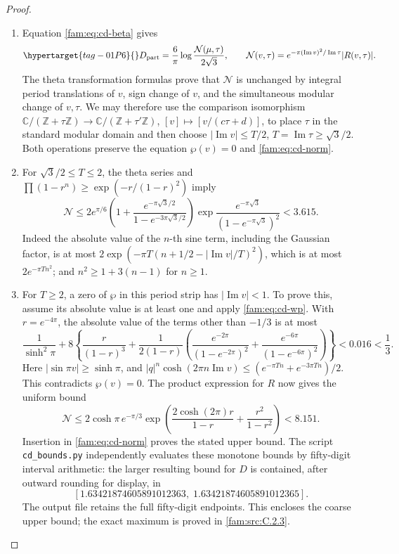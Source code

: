 \begin{proof}
\begin{enumerate}[label=\arabic*.,leftmargin=*]
\item Equation \eqref{fam:eq:cd-beta} gives
\begin{equation}\hypertarget{tag-01P6}{}\label{fam:eq:cd-norm}
 D_{\rm part}=\frac6\pi\log\frac{\mathcal N(\mu,\tau)}{2\sqrt3},
 \qquad
 \mathcal N(v,\tau)=e^{-\pi(\operatorname{Im}v)^2/\operatorname{Im}\tau}
 |R(v,\tau)|.
\end{equation}
The theta transformation formulas prove that \(\mathcal N\) is unchanged
by integral period translations of \(v\), sign change of \(v\), and the
simultaneous modular change of \(v,\tau\). We may therefore use the
comparison isomorphism \(\mathbb C/(\mathbb Z+\tau\mathbb Z)\to
\mathbb C/(\mathbb Z+\tau'\mathbb Z)\), \([v]\mapsto[v/(c\tau+d)]\), to
place \(\tau\) in the standard modular domain and then choose
\(|\operatorname{Im}v|\leq T/2\), \(T=\operatorname{Im}\tau\geq\sqrt3/2\).
Both operations preserve the equation \(\wp(v)=0\) and \eqref{fam:eq:cd-norm}.

\item For \(\sqrt3/2\leq T\leq2\), the theta series and
\(\prod(1-r^n)\geq\exp(-r/(1-r)^2)\) imply
\[
 \mathcal N\leq
 2e^{\pi/6}\left(1+\frac{e^{-\pi\sqrt3/2}}
 {1-e^{-3\pi\sqrt3/2}}\right)
 \exp\frac{e^{-\pi\sqrt3}}{(1-e^{-\pi\sqrt3})^2}
 <3.615.
\]
Indeed the absolute value of the \(n\)-th sine term, including the
Gaussian factor, is at most
\(2\exp(-\pi T(n+1/2-|\operatorname{Im}v|/T)^2)\), which is at most
\(2e^{-\pi Tn^2}\); and \(n^2\geq1+3(n-1)\) for \(n\geq1\).

\item For \(T\geq2\), a zero of \(\wp\) in this period strip has
\(|\operatorname{Im}v|<1\). To prove this, assume its absolute value is at
least one and apply \eqref{fam:eq:cd-wp}. With \(r=e^{-4\pi}\), the absolute
value of the terms other than \(-1/3\) is at most
\[
 \frac1{\sinh^2\pi}+8\left\{
 \frac r{(1-r)^3}+\frac1{2(1-r)}
 \left(\frac{e^{-2\pi}}{(1-e^{-2\pi})^2}
 +\frac{e^{-6\pi}}{(1-e^{-6\pi})^2}\right)\right\}<0.016<\frac13.
\]
Here \(|\sin\pi v|\geq\sinh\pi\), and
\(|q|^n\cosh(2\pi n\operatorname{Im}v)\leq
(e^{-\pi Tn}+e^{-3\pi Tn})/2\). This contradicts \(\wp(v)=0\).
The product expression for \(R\) now gives the uniform bound
\[
 \mathcal N\leq2\cosh\pi\,e^{-\pi/3}
 \exp\left(\frac{2\cosh(2\pi)r}{1-r}+\frac{r^2}{1-r^2}\right)
 <8.151.
\]
Insertion in \eqref{fam:eq:cd-norm} proves the stated upper bound. The script
\texttt{cd\_bounds.py} independently evaluates these monotone bounds by
fifty-digit interval arithmetic: the larger resulting bound for \(D\) is
contained, after outward rounding for display, in
\[
 [1.63421874605891012363,\;1.63421874605891012365].
\]
The output file retains the full fifty-digit endpoints.
This encloses the coarse upper bound; the exact maximum is proved in \ref{fam:src:C.2.3}.


\end{enumerate}
\end{proof}
